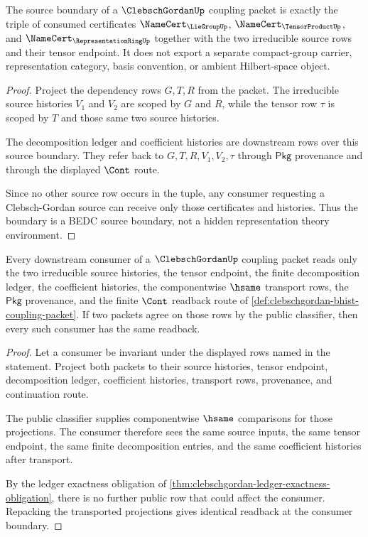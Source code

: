\begin{theorem}
\label{thm:clebschgordan-source-namecert-boundary}
The source boundary of a $\ClebschGordanUp$ coupling packet is exactly the
triple of consumed certificates
$\NameCert_{\LieGroupUp}$, $\NameCert_{\TensorProductUp}$, and
$\NameCert_{\RepresentationRingUp}$ together with the two irreducible source
rows and their tensor endpoint. It does not export a separate compact-group
carrier, representation category, basis convention, or ambient Hilbert-space
object.
\end{theorem}
\begin{proof}
Project the dependency rows $G,T,R$ from the packet. The irreducible source
histories $V_{1}$ and $V_{2}$ are scoped by $G$ and $R$, while the tensor row
$\tau$ is scoped by $T$ and those same two source histories.

The decomposition ledger and coefficient histories are downstream rows over
this source boundary. They refer back to $G,T,R,V_{1},V_{2},\tau$ through
$\mathsf{Pkg}$ provenance and through the displayed $\Cont$ route.

Since no other source row occurs in the tuple, any consumer requesting a
Clebsch-Gordan source can receive only those certificates and histories.
Thus the boundary is a BEDC source boundary, not a hidden representation
theory environment.
\end{proof}

\begin{theorem}
\label{thm:clebschgordan-consumer-readback-boundary}
Every downstream consumer of a $\ClebschGordanUp$ coupling packet reads only
the two irreducible source histories, the tensor endpoint, the finite
decomposition ledger, the coefficient histories, the componentwise $\hsame$
transport rows, the $\mathsf{Pkg}$ provenance, and the finite $\Cont$
readback route of
\autoref{def:clebschgordan-bhist-coupling-packet}. If two packets agree on
those rows by the public classifier, then every such consumer has the same
readback.
\end{theorem}
\begin{proof}
Let a consumer be invariant under the displayed rows named in the statement.
Project both packets to their source histories, tensor endpoint,
decomposition ledger, coefficient histories, transport rows, provenance, and
continuation route.

The public classifier supplies componentwise $\hsame$ comparisons for those
projections. The consumer therefore sees the same source inputs, the same
tensor endpoint, the same finite decomposition entries, and the same
coefficient histories after transport.

By the ledger exactness obligation of
\autoref{thm:clebschgordan-ledger-exactness-obligation}, there is no further
public row that could affect the consumer. Repacking the transported
projections gives identical readback at the consumer boundary.
\end{proof}

